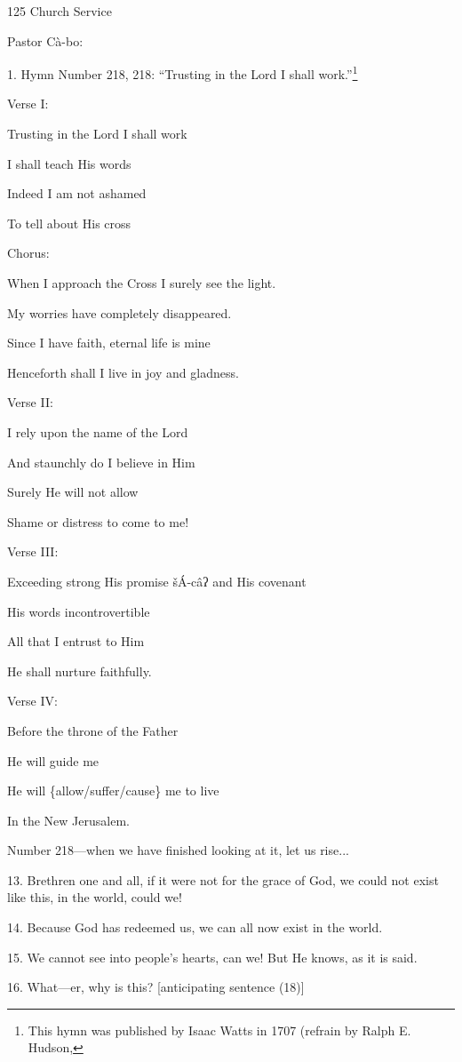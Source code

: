 
125 Church Service

Pastor Cà-bo:

1. Hymn Number 218, 218: ``Trusting in the Lord I shall work.''\footnote{This hymn was published by Isaac Watts in 1707 (refrain by Ralph E. Hudson,}

Verse I:

Trusting in the Lord I shall work

I shall teach His words

Indeed I am not ashamed

To tell about His cross

Chorus:

When I approach the Cross I surely see the light.

My worries have completely disappeared.

Since I have faith, eternal life is mine

Henceforth shall I live in joy and gladness.

Verse II:

I rely upon the name of the Lord

And staunchly do I believe in Him

Surely He will not allow

Shame or distress to come to me!

Verse III:

Exceeding strong His promise šÁ-câʔ and His covenant

His words incontrovertible

All that I entrust to Him

He shall nurture faithfully.

Verse IV:

Before the throne of the Father

He will guide me

He will \{allow/suffer/cause\} me to live

In the New Jerusalem.

Number 218---when we have finished looking at it, let us rise...

13. Brethren one and all, if it were not for the grace of God, we could not exist
like this, in the world, could we!

14. Because God has redeemed us, we can all now exist in the world.

15. We cannot see into people's hearts, can we! But He knows, as it is said.

16. What---er, why is this? [anticipating sentence (18)]

